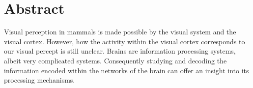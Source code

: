 \begingroup
\let\clearpage\relax
\let\cleardoublepage\relax
\let\cleardoublepage\relax

\chapter*{Abstract}

Visual perception in mammals is made possible by the visual system and the visual cortex.
However, how the activity within the visual cortex corresponds to our visual percept is still unclear.
Brains are information processing systems, albeit very complicated systems.
Consequently studying and decoding the information encoded within the networks of the brain can offer an insight into its processing mechanisms.

